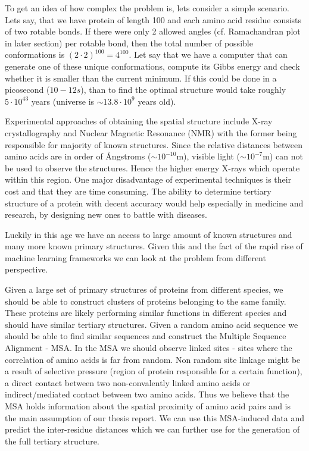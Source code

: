To get an idea of how complex the problem is, lets consider a simple scenario. 
Lets say, that we have protein of length 100 and each amino acid residue consists of two rotable bonds. 
If there were only 2 allowed angles (cf. Ramachandran plot in later section) per rotable bond, then the total number of possible conformations is $(2\cdot2)^{100} = 4^{100}$. 
Let say that we have a computer that can generate one of these unique conformations, compute its Gibbs energy and check whether it is smaller than the current minimum. 
If this could be done in a picosecond ($10-{12} s$), than to find the optimal structure would take roughly $5 \cdot 10^{43}$ years (universe is $\sim 13.8\cdot10^9$ years old).
    
Experimental approaches of obtaining the spatial structure include X-ray crystallography and Nuclear Magnetic Resonance (NMR) with the former being responsible for majority of known structures. 
Since the relative distances between amino acids are in order of \AA ngstroms ($\sim10^{-10}$m), visible light ($\sim10^{-7}$m) can not be used to observe the structures. 
Hence the higher energy X-rays which operate within this region. 
One major disadvantage of experimental techniques is their cost and that they are time consuming.
The ability to determine tertiary structure of a protein with decent accuracy would help especially in medicine and research, by designing new ones to battle with diseases.
    
Luckily in this age we have an access to large amount of known structures and many more known primary structures. 
Given this and the fact of the rapid rise of machine learning frameworks we can look at the problem from different perspective.
    
Given a large set of primary structures of proteins from different species, we should be able to construct clusters of proteins belonging to the same family. 
These proteins are likely performing similar functions in different species and should have similar tertiary structures. 
Given a random amino acid sequence we should be able to find similar sequences and construct the Multiple Sequence Alignment - MSA. 
In the MSA we should observe linked sites - sites where the correlation of amino acids is far from random. 
Non random site linkage might be a result of selective pressure (region of protein responsible for a certain function), a direct contact between two non-convalently linked amino acids or indirect/mediated contact between two amino acids. 
Thus we believe that the MSA holds information about the spatial proximity of amino acid pairs and is the main assumption of our thesis report. 
We can use this MSA-induced data and predict the inter-residue distances which we can further use for the generation of the full tertiary structure.
    
